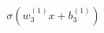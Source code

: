\documentclass[preview]{standalone}
\begin{document}
\begin{align*}
\sigma(w_3^{(1)} x + b_3^{(1)})
\end{align*}
\end{document}
